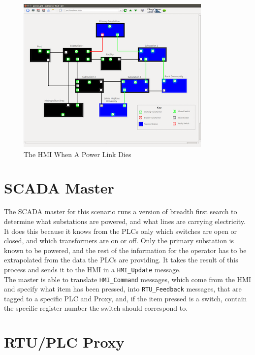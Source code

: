 \documentclass[oneside,11pt,a4paper,oldfontcommands]{book}
\def\code#1{\texttt{#1}}
\begin{document}
\begin{figure}[ht]
  \begin{center}
  \includegraphics{dead_link_screen_shot}
  \caption{The HMI When A Power Link Dies}
  \label{fig:13}
  \end{center}
\end{figure}


\section{SCADA Master}

\indent \indent

The SCADA master for this scenario runs a version of breadth first search to determine
what substations are powered, and what lines are carrying electricity. It does this because
it knows from the PLCs only which switches are open or closed, and which transformers are
on or off. Only the primary substation is known to be powered, and the rest of the 
information for the operator has to be extrapolated from the data the PLCs are providing.
It takes the result of this process and sends it to the HMI in a 
\code{HMI\_Update} message.
\\

\indent
The master is able to translate \code{HMI\_Command} messages, which come from the HMI and 
specify what item has been pressed, into \code{RTU\_Feedback} messages, that are tagged to 
a specific PLC and Proxy, and, if the item pressed is a switch, contain the specific
register number the switch should correspond to. \\

\section{RTU/PLC Proxy}
\end{document}

